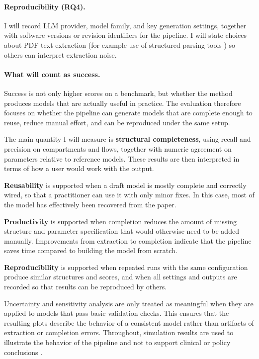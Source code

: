 \documentclass[a4paper,12pt]{article}
\begin{document}
\paragraph{Reproducibility (RQ4).}
I will record LLM provider, model family, and key generation settings, together with software versions or revision identifiers for the pipeline. I will state choices about PDF text extraction (for example use of structured parsing tools \citep{romary2015grobid}) so others can interpret extraction noise.

\paragraph{What will count as success.}
Success is not only higher scores on a benchmark, but whether the method produces models that are actually useful in practice. The evaluation therefore focuses on whether the pipeline can generate models that are complete enough to reuse, reduce manual effort, and can be reproduced under the same setup.

The main quantity I will measure is \textbf{structural completeness}, using recall and precision on compartments and flows, together with numeric agreement on parameters relative to reference models. These results are then interpreted in terms of how a user would work with the output.

\textbf{Reusability} is supported when a draft model is mostly complete and correctly wired, so that a practitioner can use it with only minor fixes. In this case, most of the model has effectively been recovered from the paper.

\textbf{Productivity} is supported when completion reduces the amount of missing structure and parameter specification that would otherwise need to be added manually. Improvements from extraction to completion indicate that the pipeline saves time compared to building the model from scratch.

\textbf{Reproducibility} is supported when repeated runs with the same configuration produce similar structures and scores, and when all settings and outputs are recorded so that results can be reproduced by others.

Uncertainty and sensitivity analysis are only treated as meaningful when they are applied to models that pass basic validation checks. This ensures that the resulting plots describe the behavior of a consistent model rather than artifacts of extraction or completion errors. Throughout, simulation results are used to illustrate the behavior of the pipeline and not to support clinical or policy conclusions \citep{Ferguson2006Influenza}.
\end{document}
